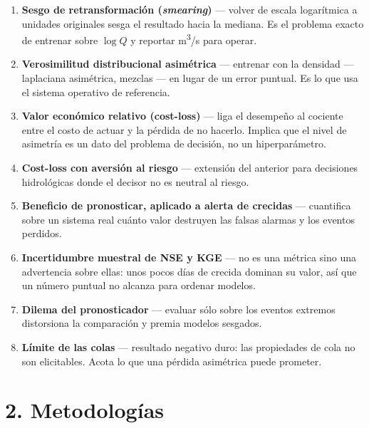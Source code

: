 \documentclass{../comun/tesisuba}
\newcommand{\entrada}[2]{\item \textbf{#1} --- #2}
\begin{document}
\begin{enumerate}[leftmargin=*, itemsep=3pt]
\entrada{Sesgo de retransformación (\textit{smearing})}{volver de escala logarítmica a unidades
originales sesga el resultado hacia la mediana. Es el problema exacto de entrenar sobre $\log Q$ y
reportar m\textsuperscript{3}/s para operar. \citet{duan-1983-smearing-retransformation}}

\entrada{Verosimilitud distribucional asimétrica}{entrenar con la densidad --- laplaciana
asimétrica, mezclas --- en lugar de un error puntual. Es lo que usa el sistema operativo de
referencia. \citet{klotz-2022-uncertainty-deep-learning-rainfall-runoff}}

\entrada{Valor económico relativo (cost-loss)}{liga el desempeño al cociente entre el costo de
actuar y la pérdida de no hacerlo. Implica que el nivel de asimetría es un dato del problema de
decisión, no un hiperparámetro. \citet{richardson-2000-relative-economic-value}}

\entrada{Cost-loss con aversión al riesgo}{extensión del anterior para decisiones hidrológicas
donde el decisor no es neutral al riesgo. \citet{matte-2017-beyond-cost-loss}}

\entrada{Beneficio de pronosticar, aplicado a alerta de crecidas}{cuantifica sobre un sistema real
cuánto valor destruyen las falsas alarmas y los eventos perdidos.
\citet{verkade-werner-2011-flood-warning-benefits}}

\entrada{Incertidumbre muestral de NSE y KGE}{no es una métrica sino una advertencia sobre ellas:
unos pocos días de crecida dominan su valor, así que un número puntual no alcanza para ordenar
modelos. \citet{clark-2021-abuse-performance-metrics}}

\entrada{Dilema del pronosticador}{evaluar sólo sobre los eventos extremos distorsiona la
comparación y premia modelos sesgados. \citet{lerch-2017-forecasters-dilemma}}

\entrada{Límite de las colas}{resultado negativo duro: las propiedades de cola no son elicitables.
Acota lo que una pérdida asimétrica puede prometer.
\citet{brehmer-strokorb-2019-tail-properties}}

\end{enumerate}

\newpage

\section*{2. Metodologías}
\end{document}
